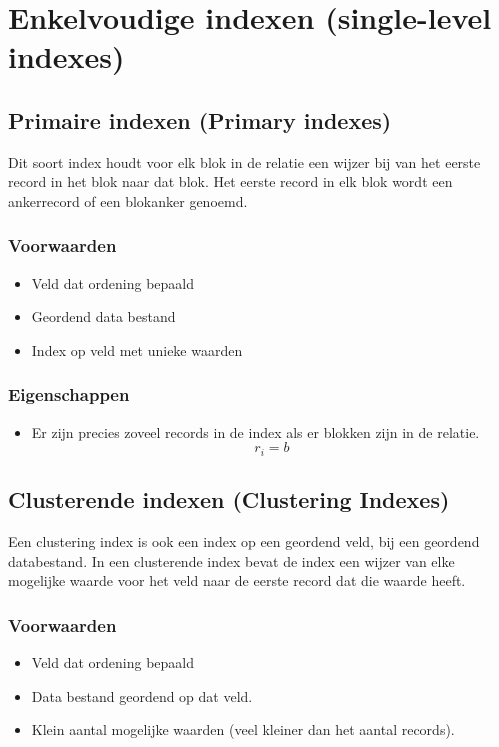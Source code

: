 \documentclass[indexstructuren.tex]{subfiles}
\begin{document}
\section{Enkelvoudige indexen (single-level indexes)}
\subsection{Primaire indexen (Primary indexes)}
Dit soort index houdt voor elk blok in de relatie een wijzer bij van het eerste record in het blok naar dat blok. Het eerste record in elk blok wordt een ankerrecord of een blokanker genoemd.

\subsubsection*{Voorwaarden}
\begin{itemize}
\item Veld dat ordening bepaald
\item Geordend data bestand
\item Index op veld met unieke waarden
\end{itemize}
\subsubsection*{Eigenschappen}
\begin{itemize}
\item
Er zijn precies zoveel records in de index als er blokken zijn in de relatie.
\[
r_i = b
\]
\end{itemize}

\subsection{Clusterende indexen (Clustering Indexes)}
Een clustering index is ook een index op een geordend veld, bij een geordend databestand. In een clusterende index bevat de index een wijzer van elke mogelijke waarde voor het veld naar de eerste  record dat die waarde heeft.

\subsubsection*{Voorwaarden}
\begin{itemize}
\item Veld dat ordening bepaald
\item Data bestand geordend op dat veld.
\item Klein aantal mogelijke waarden (veel kleiner dan het aantal records).
\end{itemize}
\end{document}
